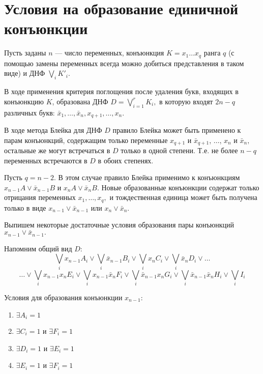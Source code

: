 \documentclass[12pt,a4paper,oneside,fleqn,leqno]{article}
\theoremstyle{definition}
\begin{document}
\section{Условия на образование единичной конъюнкции}
		Пусть заданы $n$ --- число переменных, конъюнкция $K = x_1\ldots x_q$ ранга $q$ (с помощью замены переменных всегда можно добиться представления в таком виде) и ДНФ $\bigvee\limits_iK'_i.$\par
		В ходе применения критерия поглощения после удаления букв, входящих в конъюнкцию $K$, образована ДНФ $D = \bigvee\limits_{i = 1}^rK_i,$ в которую входят $2n - q$ различных букв: $\bar{x}_1,\ldots,\bar{x}_n, x_{q + 1},\ldots, x_n$.\par
		В ходе метода Блейка для ДНФ $D$ правило Блейка может быть применено к парам конъюнкций, содержащим только переменные $x_{q+1}$ и $\bar{x}_{q+1}$, $\ldots$, $x_{n}$ и $\bar{x}_{n},$ остальные же могут встречаться в $D$ только в одной степени. Т.е. не более $n - q$ переменных встречаются в $D$ в обоих степенях.\par
		Пусть $q = n - 2$. В этом случае правило Блейка применимо к конъюнкциям $x_{n - 1}A \vee \bar{x}_{n - 1}B$ и $x_{n}A \vee \bar{x}_{n}B.$ Новые образованные конъюнкции содержат только отрицания переменных $x_1,\ldots,x_q,$ и тождественная единица может быть получена только в виде $x_{n - 1} \vee \bar{x}_{n - 1}$ или $x_{n} \vee \bar{x}_{n}.$\par
		Выпишем некоторые достаточные условия образования пары конъюнкций $x_{n - 1} \vee \bar{x}_{n - 1}.$\par
		Напомним общий вид $D$:
		$$
				\bigvee_ix_{n - 1}A_i \vee \bigvee_i\bar{x}_{n - 1}B_i \vee \bigvee_ix_nC_i \vee \bigvee_i\bar{x}_nD_i \vee \ldots
		$$
		$$
		\ldots \vee \bigvee_ix_{n - 1}x_nE_i \vee \bigvee_ix_{n - 1}\bar{x}_nF_i \vee \bigvee_i\bar{x}_{n - 1}x_nG_i \vee \bigvee_i\bar{x}_{n - 1}\bar{x}_nH_i \vee \bigvee_iI_i
		$$
		\begin{minipage}[t]{0.5\textwidth}
		Условия для образования конъюнкции $x_{n - 1}$:
		\begin{enumerate}
			\item
			$\exists A_i = 1$
			\item
			$\exists C_i = 1$ и $\exists F_i = 1$
			\item
			$\exists D_i = 1$ и $\exists E_i = 1$
			\item
			$\exists E_i = 1$ и $\exists F_i = 1$\vspace{10pt}
		\end{enumerate}
		\end{minipage}
\end{document}
